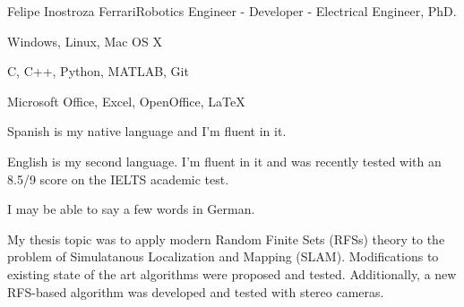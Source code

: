\documentclass{article}
\begin{document}
\begin{cv}[avatar]{Felipe Inostroza Ferrari}{Robotics Engineer - Developer - Electrical Engineer, PhD.}
	\cvseparator
	\begin{cvitem}
		Windows, Linux, Mac OS X
	\end{cvitem}

	\cvseparator

	\begin{cvitem}
		C, C++, Python, MATLAB, Git
	\end{cvitem}

	\cvseparator
	\begin{cvitem}
		Microsoft Office, Excel, OpenOffice, \LaTeX
	\end{cvitem}





	Spanish is my native language and I'm fluent in it.

	English is my second language. I'm fluent in it and was recently tested with an 8.5/9 score on the IELTS academic test.

	I may be able to say a few words in German.









\end{cv}

\clearpage
{}  %

\begin{cvevent}[2014][2023]
	My thesis topic was to apply modern Random Finite Sets (RFSs) theory to the problem of Simulatanous Localization and Mapping (SLAM). Modifications to existing state of the art algorithms were proposed and tested. Additionally, a new RFS-based algorithm was developed and tested with stereo cameras.
\end{cvevent}
\end{document}
